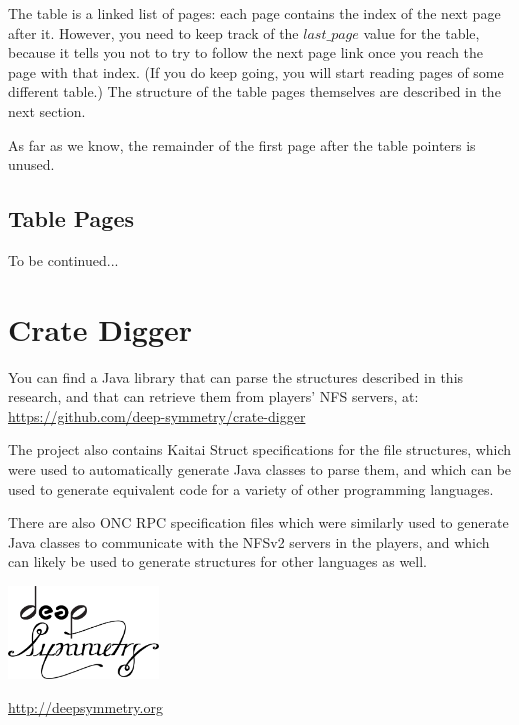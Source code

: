 \documentclass[11pt]{article}
\begin{document}
The table is a linked list of pages: each page contains the index of
the next page after it. However, you need to keep track of the
$last\_page$ value for the table, because it tells you not to try to
follow the next page link once you reach the page with that index. (If
you do keep going, you will start reading pages of some different
table.) The structure of the table pages themselves are described
in the next section.

As far as we know, the remainder of the first page after the table
pointers is unused.


\subsection{Table Pages}

To be continued...

\section{Crate Digger}

You can find a Java library that can parse the structures described in
this research, and that can retrieve them from players' NFS servers,
at: \url{https://github.com/deep-symmetry/crate-digger}

The project also contains Kaitai Struct specifications for the file
structures, which were used to automatically generate Java classes to
parse them, and which can be used to generate equivalent code for a
variety of other programming languages.

There are also ONC RPC specification files which were similarly used
to generate Java classes to communicate with the NFSv2 servers in the
players, and which can likely be used to generate structures for other
languages as well.

\begin{appendix}

  \listoffigures

  \listoftables

  \begin{center}
    \begin{samepage}
      \includegraphics[width=4cm]{assets/DS-Logo-bw-4k}

      \vspace{0.25cm}
      \url{http://deepsymmetry.org}
    \end{samepage}
  \end{center}

\end{appendix}
\end{document}
